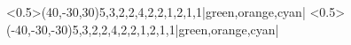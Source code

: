 \blockstructure<0.5>(40,-30,30){{5,3,2,2},{4,2,2,1},{2,1},{1}}|green,orange,cyan|%
\blockstructure<0.5>(-40,-30,-30){{5,3,2,2},{4,2,2,1},{2,1},{1}}|green,orange,cyan|
%
\endinput 
